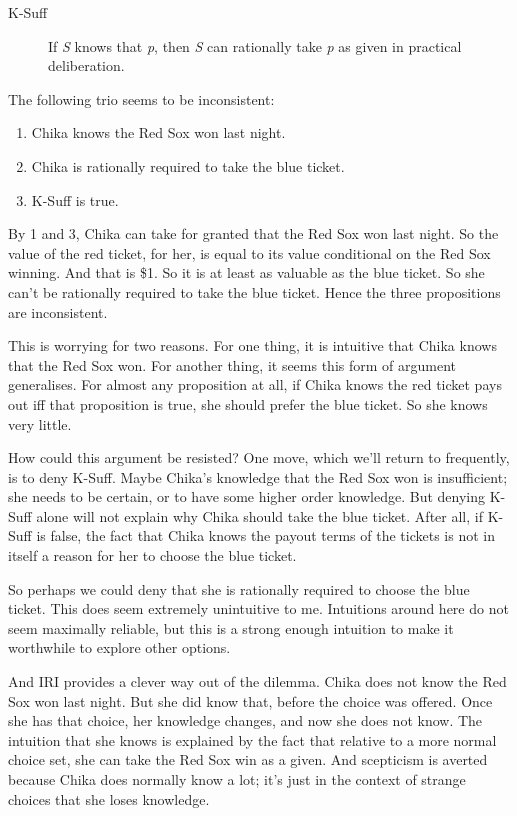 \begin{description}

\item[K-Suff]

If \emph{S} knows that \emph{p}, then \emph{S} can rationally take \emph{p} as given in practical deliberation.
\end{description}
The following trio seems to be inconsistent:

\begin{enumerate}
\item Chika knows the Red Sox won last night.

\item Chika is rationally required to take the blue ticket.

\item K-Suff is true.

\end{enumerate}
By 1 and 3, Chika can take for granted that the Red Sox won last night. So the value of the red ticket, for her, is equal to its value conditional on the Red Sox winning. And that is \$1. So it is at least as valuable as the blue ticket. So she can't be rationally required to take the blue ticket. Hence the three propositions are inconsistent.

This is worrying for two reasons. For one thing, it is intuitive that Chika knows that the Red Sox won. For another thing, it seems this form of argument generalises. For almost any proposition at all, if Chika knows the red ticket pays out iff that proposition is true, she should prefer the blue ticket. So she knows very little.

How could this argument be resisted? One move, which we'll return to frequently, is to deny K-Suff. Maybe Chika's knowledge that the Red Sox won is insufficient; she needs to be certain, or to have some higher order knowledge. But denying K-Suff alone will not explain why Chika should take the blue ticket. After all, if K-Suff is false, the fact that Chika knows the payout terms of the tickets is not in itself a reason for her to choose the blue ticket. 

So perhaps we could deny that she is rationally required to choose the blue ticket. This does seem extremely unintuitive to me. Intuitions around here do not seem maximally reliable, but this is a strong enough intuition to make it worthwhile to explore other options.

And IRI provides a clever way out of the dilemma. Chika does not know the Red Sox won last night. But she did know that, before the choice was offered. Once she has that choice, her knowledge changes, and now she does not know. The intuition that she knows is explained by the fact that relative to a more normal choice set, she can take the Red Sox win as a given. And scepticism is averted because Chika does normally know a lot; it's just in the context of strange choices that she loses knowledge.

